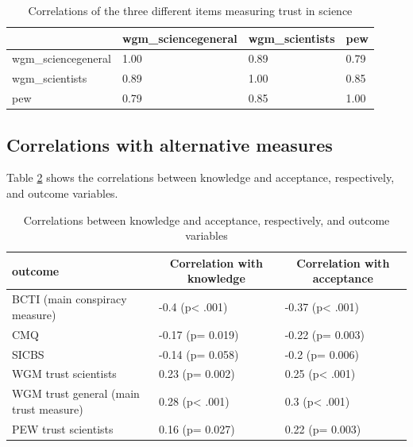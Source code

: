 \documentclass[
  doc,floatsintext]{apa6}
\begin{document}
\begin{table}[h]

\begin{center}
\begin{threeparttable}

\caption{\label{tab:exp2-correlation-trust}Correlations of the three different items measuring trust in science}

\begin{tabular}{llll}
\toprule
 & \multicolumn{1}{c}{wgm\_sciencegeneral} & \multicolumn{1}{c}{wgm\_scientists} & \multicolumn{1}{c}{pew}\\
\midrule
wgm\_sciencegeneral & 1.00 & 0.89 & 0.79\\
wgm\_scientists & 0.89 & 1.00 & 0.85\\
pew & 0.79 & 0.85 & 1.00\\
\bottomrule
\end{tabular}

\end{threeparttable}
\end{center}

\end{table}

\subsection{Correlations with alternative measures}\label{correlations-with-alternative-measures-1}

Table \ref{tab:exp2-correlations-outcomes} shows the correlations between knowledge and acceptance, respectively, and outcome variables.

\begin{table}[tbp]

\begin{center}
\begin{threeparttable}

\caption{\label{tab:exp2-correlations-outcomes}Correlations between knowledge and acceptance, respectively, and outcome variables}

\begin{tabular}{lll}
\toprule
outcome & \multicolumn{1}{c}{Correlation with knowledge} & \multicolumn{1}{c}{Correlation with acceptance}\\
\midrule
BCTI (main conspiracy measure) & -0.4 (p< .001) & -0.37 (p< .001)\\
CMQ & -0.17 (p= 0.019) & -0.22 (p= 0.003)\\
SICBS & -0.14 (p= 0.058) & -0.2 (p= 0.006)\\
WGM trust scientists & 0.23 (p= 0.002) & 0.25 (p< .001)\\
WGM trust general (main trust measure) & 0.28 (p< .001) & 0.3 (p< .001)\\
PEW trust scientists & 0.16 (p= 0.027) & 0.22 (p= 0.003)\\
\bottomrule
\end{tabular}

\end{threeparttable}
\end{center}

\end{table}
\end{document}
